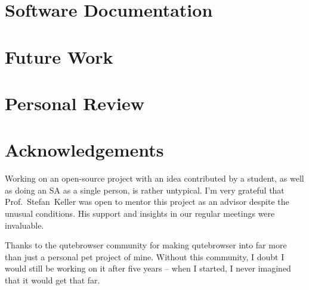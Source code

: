 \documentclass[a4paper,parskip=full]{scrreprt}
\begin{document}
\section{Software Documentation}


\section{Future Work}

% 
% 
% 



\section{Personal Review}

\section{Acknowledgements}
Working on an open-source project with an idea contributed by a student, as well
as doing an SA as a single person, is rather untypical. I'm very grateful that
Prof.~Stefan~Keller was open to mentor this project as an advisor despite the
unusual conditions. His support and insights in our regular meetings were
invaluable.

Thanks to the qutebrowser community for making qutebrowser into far more than
just a personal pet project of mine. Without this community, I doubt I would
still be working on it after five years -- when I started, I never imagined that
it would get that far.
\end{document}
